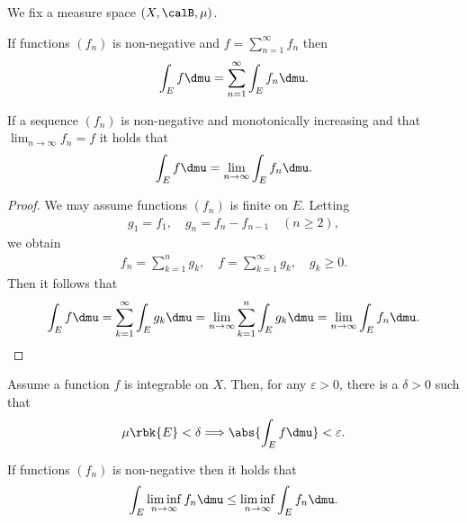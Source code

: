 \documentclass[openany, a4paper, oneside]{jsbook}
\begin{document}
We fix a measure space $(X, \calB, \mu)$.
\begin{thm}
 If functions $(f_n)$ is non-negative and $f = \sum_{n=1}^{\infty} f_n$ then
 \begin{align}
  \int_E f \dmu
  =
  \sum_{n=1}^{\infty} \int_E f_n \dmu.
 \end{align}
\end{thm}
\begin{thm}
 If a sequence $(f_n)$ is non-negative and monotonically increasing and that $\lim_{n \to \infty} f_n = f$ it holds that
 \begin{align}
  \int_E f \dmu
  =
  \lim_{n \to \infty} \int_E f_n \dmu.
 \end{align}
\end{thm}
\begin{proof}
We may assume functions $(f_n)$ is finite on $E$.
Letting
\begin{align}
 g_1 = f_1, \quad
 g_n = f_n - f_{n-1} \quad (n \geq 2),
\end{align}
we obtain
\begin{align}
 f_n
 =
 \sum_{k=1}^n g_k, \quad
 f
 =
 \sum_{k=1}^{\infty} g_k, \quad
 g_k \geq 0.
\end{align}
Then it follows that
\begin{align}
 \int_E f \dmu
 =
 \sum_{k=1}^{\infty} \int_E g_k \dmu
 =
 \lim_{n \to \infty} \sum_{k=1}^n \int_E g_k \dmu
 =
 \lim_{n \to \infty} \int_E f_n \dmu.
\end{align}
\end{proof}
\begin{thm}
 Assume a function $f$ is integrable on $X$.
 Then, for any $\varepsilon > 0$, there is a $\delta > 0$ such that
 \begin{align}
  \mu \rbk{E} < \delta
  \Longrightarrow
  \abs{\int_E f \dmu} < \varepsilon.
 \end{align}
\end{thm}
\begin{thm}
 If functions $(f_n)$ is non-negative then it holds that
 \begin{align}
  \int_E \liminf_{n \to \infty} f_n \dmu
  \leq
  \liminf_{n \to \infty} \int_E f_n \dmu.
 \end{align}
\end{thm}
\end{document}

